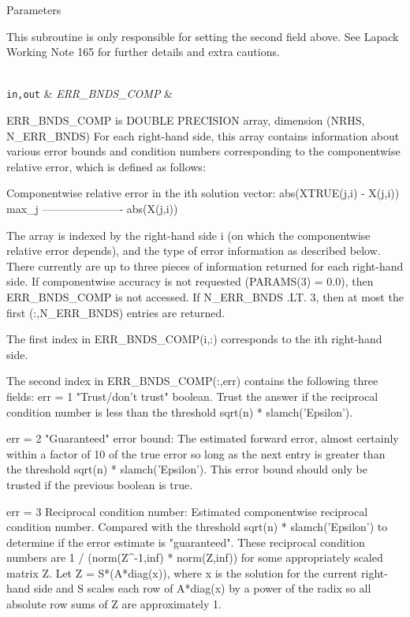\begin{DoxyParams}[1]{Parameters}
\begin{DoxyVerb}
     This subroutine is only responsible for setting the second field
     above.
     See Lapack Working Note 165 for further details and extra
     cautions.\end{DoxyVerb}
\\
\hline
\mbox{\tt in,out}  & {\em E\+R\+R\+\_\+\+B\+N\+D\+S\+\_\+\+C\+O\+M\+P} & \begin{DoxyVerb}          ERR_BNDS_COMP is DOUBLE PRECISION array, dimension
                    (NRHS, N_ERR_BNDS)
     For each right-hand side, this array contains information about
     various error bounds and condition numbers corresponding to the
     componentwise relative error, which is defined as follows:

     Componentwise relative error in the ith solution vector:
                    abs(XTRUE(j,i) - X(j,i))
             max_j ----------------------
                         abs(X(j,i))

     The array is indexed by the right-hand side i (on which the
     componentwise relative error depends), and the type of error
     information as described below. There currently are up to three
     pieces of information returned for each right-hand side. If
     componentwise accuracy is not requested (PARAMS(3) = 0.0), then
     ERR_BNDS_COMP is not accessed.  If N_ERR_BNDS .LT. 3, then at most
     the first (:,N_ERR_BNDS) entries are returned.

     The first index in ERR_BNDS_COMP(i,:) corresponds to the ith
     right-hand side.

     The second index in ERR_BNDS_COMP(:,err) contains the following
     three fields:
     err = 1 "Trust/don't trust" boolean. Trust the answer if the
              reciprocal condition number is less than the threshold
              sqrt(n) * slamch('Epsilon').

     err = 2 "Guaranteed" error bound: The estimated forward error,
              almost certainly within a factor of 10 of the true error
              so long as the next entry is greater than the threshold
              sqrt(n) * slamch('Epsilon'). This error bound should only
              be trusted if the previous boolean is true.

     err = 3  Reciprocal condition number: Estimated componentwise
              reciprocal condition number.  Compared with the threshold
              sqrt(n) * slamch('Epsilon') to determine if the error
              estimate is "guaranteed". These reciprocal condition
              numbers are 1 / (norm(Z^{-1},inf) * norm(Z,inf)) for some
              appropriately scaled matrix Z.
              Let Z = S*(A*diag(x)), where x is the solution for the
              current right-hand side and S scales each row of
              A*diag(x) by a power of the radix so all absolute row
              sums of Z are approximately 1.


\end{DoxyVerb}
\end{DoxyParams}
